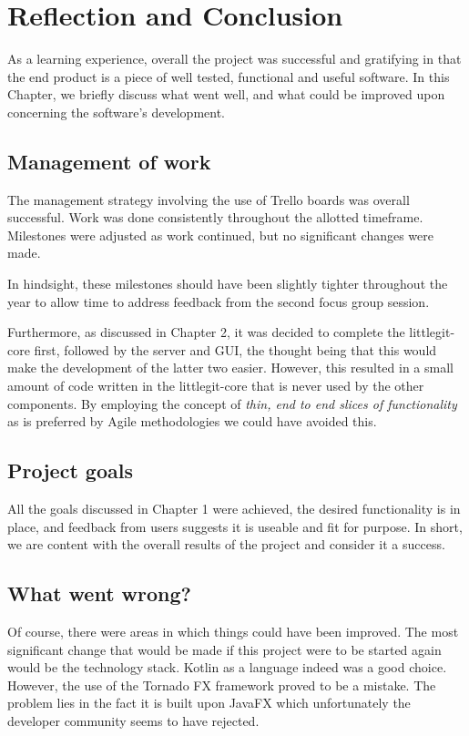 
\chapter{Reflection and Conclusion}

As a learning experience, overall the project was successful and gratifying in that the end product is a piece of well tested, functional and useful software. In this Chapter, we briefly discuss what went well, and what could be improved upon concerning the software's development.

\section{Management of work}

The management strategy involving the use of Trello boards was overall successful. Work was done consistently throughout the allotted timeframe. Milestones were adjusted as work continued, but no significant changes were made. 

In hindsight, these milestones should have been slightly tighter throughout the year to allow time to address feedback from the second focus group session.

Furthermore, as discussed in Chapter 2, it was decided to complete the littlegit-core first, followed by the server and GUI, the thought being that this would make the development of the latter two easier. However, this resulted in a small amount of code written in the littlegit-core that is never used by the other components. By employing the concept of \emph{thin, end to end slices of functionality} as is preferred by Agile methodologies we could have avoided this.


\section{Project goals}

All the goals discussed in Chapter 1 were achieved, the desired functionality is in place, and feedback from users suggests it is useable and fit for purpose.  In short, we are content with the overall results of the project and consider it a success.


\section{What went wrong?}

Of course, there were areas in which things could have been improved. The most significant change that would be made if this project were to be started again would be the technology stack. Kotlin as a language indeed was a good choice. However, the use of the Tornado FX framework proved to be a mistake. The problem lies in the fact it is built upon JavaFX which unfortunately the developer community seems to have rejected.

